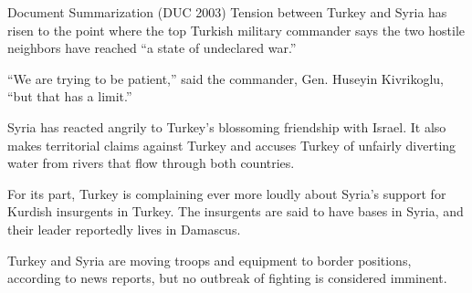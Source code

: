 \documentclass{beamer}
\begin{document}
\begin{frame}[fragile]{Document Summarization (DUC 2003)}
   Tension between Turkey and Syria has risen to
the point where the top Turkish military commander says the two
hostile neighbors have reached ``a state of undeclared war.''

   ``We are trying to be patient,'' said the commander, Gen.
Huseyin Kivrikoglu, ``but that has a limit.''

   Syria has reacted angrily to Turkey's blossoming friendship with
Israel. It also makes territorial claims against Turkey and accuses
Turkey of unfairly diverting water from rivers that flow through
both countries.

   For its part, Turkey is complaining ever more loudly about
Syria's support for Kurdish insurgents in Turkey. The insurgents
are said to have bases in Syria, and their leader reportedly lives
in Damascus.

   Turkey and Syria are moving troops and equipment to border
positions, according to news reports, but no outbreak of fighting
is considered imminent.

\end{frame}





                                                                 
                                                                                     
\end{document}
